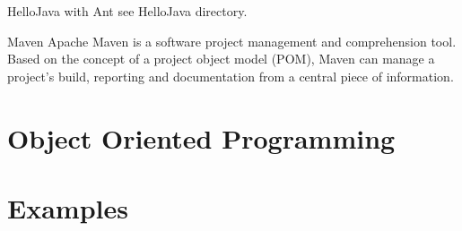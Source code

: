\documentclass[UTF8]{beamer}
\begin{document}
\begin{frame}[t]{HelloJava with Ant}
  see HelloJava directory.
\end{frame}

\begin{frame}[t]{Maven}
Apache Maven is a software project management and comprehension tool. Based on
the concept of a project object model (POM), Maven can manage a project's build,
 reporting and documentation from a central piece of information.
\end{frame}

\section{Object Oriented Programming}



\section{Examples}
\end{document}
